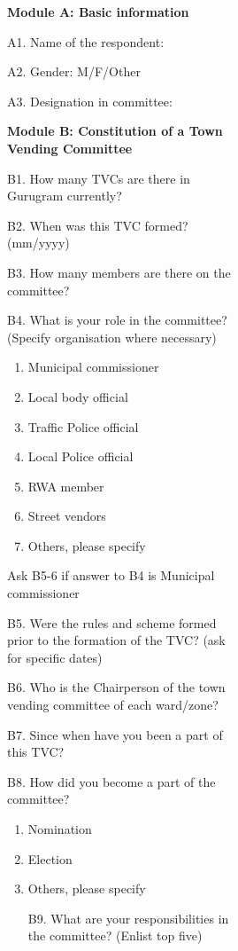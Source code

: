 \documentclass[a4paper, 12pt, twoside]{article}
\begin{document}
\begin{figure}
{\begin{figure}
\begin{figure}
\begin{mdframed}[backgroundcolor=gray!20]
\textbf{Module A: Basic information}

A1. Name of the respondent:

A2. Gender: M/F/Other

A3. Designation in committee:


\textbf{Module B: Constitution of a Town Vending Committee}

B1. How many TVCs are there in Gurugram currently?

B2. When was this TVC formed? (mm/yyyy)

B3. How many members are there on the committee?

B4. What is your role in the committee? (Specify organisation where necessary)

\begin{enumerate}[nosep]
\item Municipal commissioner
\item Local body official
\item Traffic Police official
\item Local Police official
\item RWA member
\item Street vendors
\item Others, please specify
\end{enumerate}

Ask B5-6 if answer to B4 is Municipal commissioner

B5. Were the rules and scheme formed prior to the formation of the TVC? (ask for specific dates)

B6. Who is the Chairperson of the town vending committee of each ward/zone?

B7. Since when have you been a part of this TVC?

B8. How did you become a part of the committee?
\begin{enumerate}[nosep]
\item Nomination
\item Election
\item Others, please specify

B9. What are your responsibilities in the committee? (Enlist top five)


\end{enumerate}
\end{mdframed}
\end{figure}
\end{figure}}
\end{figure}
\end{document}
